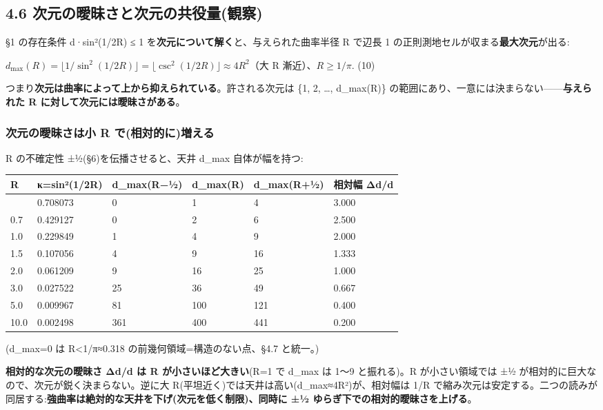 \documentclass[
]{ltjsarticle}
\newcounter{none} %
\begin{document}
\subsection{4.6
次元の曖昧さと次元の共役量(観察)}\label{ux6b21ux5143ux306eux66d6ux6627ux3055ux3068ux6b21ux5143ux306eux5171ux5f79ux91cfux89b3ux5bdf}

§1 の存在条件 d·sin²(1/2R) ≤ 1
を\textbf{次元について解く}と、与えられた曲率半径 R で辺長 1
の正則測地セルが収まる\textbf{最大次元}が出る:

\(d_{\max}(R) = \lfloor 1/\sin^2(1/2R)\rfloor = \lfloor \csc^2(1/2R)\rfloor \approx 4R^2\)（大
R 漸近）、\(R \ge 1/\pi\). (10)

つまり\textbf{次元は曲率によって上から抑えられている}。許される次元は
\{1, 2, \ldots, d\_max(R)\}
の範囲にあり、一意には決まらない------\textbf{与えられた R
に対して次元には曖昧さがある}。

\subsubsection{次元の曖昧さは小 R
で(相対的に)増える}\label{ux6b21ux5143ux306eux66d6ux6627ux3055ux306fux5c0f-r-ux3067ux76f8ux5bfeux7684ux306bux5897ux3048ux308b}

R の不確定性 ±½(§6)を伝播させると、天井 d\_max 自体が幅を持つ:

{\def\LTcaptype{none} %
\begin{longtable}[]{@{}llllll@{}}
\toprule\noalign{}
R & κ=sin²(1/2R) & d\_max(R−½) & d\_max(R) & d\_max(R+½) & 相対幅
Δd/d \\
\midrule\noalign{}
\endhead
\bottomrule\noalign{}
\endlastfoot
0.5 & 0.708073 & 0 & 1 & 4 & 3.000 \\
0.7 & 0.429127 & 0 & 2 & 6 & 2.500 \\
1.0 & 0.229849 & 1 & 4 & 9 & 2.000 \\
1.5 & 0.107056 & 4 & 9 & 16 & 1.333 \\
2.0 & 0.061209 & 9 & 16 & 25 & 1.000 \\
3.0 & 0.027522 & 25 & 36 & 49 & 0.667 \\
5.0 & 0.009967 & 81 & 100 & 121 & 0.400 \\
10.0 & 0.002498 & 361 & 400 & 441 & 0.200 \\
\end{longtable}
}

(d\_max=0 は R\textless1/π≈0.318 の前幾何領域=構造のない点、§4.7
と統一。)

\textbf{相対的な次元の曖昧さ Δd/d は R が小さいほど大きい}(R=1 で d\_max
は 1〜9 と振れる)。R が小さい領域では ±½
が相対的に巨大なので、次元が鋭く決まらない。逆に大
R(平坦近く)では天井は高い(d\_max≈4R²)が、相対幅は 1/R
で縮み次元は安定する。二つの読みが同居する:\textbf{強曲率は絶対的な天井を下げ(次元を低く制限)、同時に
±½ ゆらぎ下での相対的曖昧さを上げる}。
\end{document}

